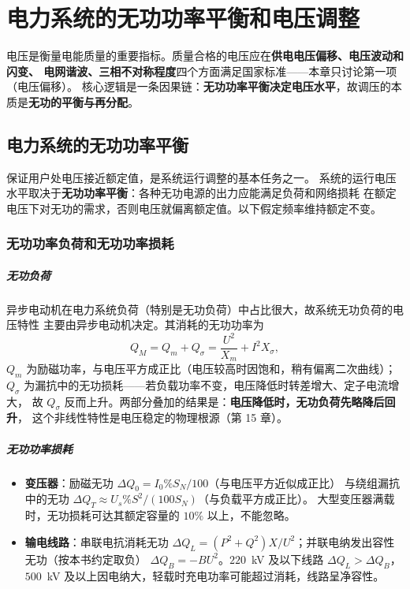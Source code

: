 ﻿%

\chapter{电力系统的无功功率平衡和电压调整}

电压是衡量电能质量的重要指标。质量合格的电压应在\textbf{供电电压偏移、电压波动和闪变、
电网谐波、三相不对称程度}四个方面满足国家标准——本章只讨论第一项（电压偏移）。
核心逻辑是一条因果链：\textbf{无功功率平衡决定电压水平}，故调压的本质是\textbf{无功的平衡与再分配}。

\section{电力系统的无功功率平衡}

保证用户处电压接近额定值，是系统运行调整的基本任务之一。
系统的运行电压水平取决于\textbf{无功功率平衡}：各种无功电源的出力应能满足负荷和网络损耗
在额定电压下对无功的需求，否则电压就偏离额定值。以下假定频率维持额定不变。

\subsection{无功功率负荷和无功功率损耗}

\paragraph{无功负荷}
异步电动机在电力系统负荷（特别是无功负荷）中占比很大，故系统无功负荷的电压特性
主要由异步电动机决定。其消耗的无功功率为
\begin{equation}
  Q_M=Q_m+Q_\sigma=\frac{U^{2}}{X_m}+I^{2}X_\sigma ,
\end{equation}
$Q_m$ 为励磁功率，与电压平方成正比（电压较高时因饱和，稍有偏离二次曲线）；
$Q_\sigma$ 为漏抗中的无功损耗——若负载功率不变，电压降低时转差增大、定子电流增大，
故 $Q_\sigma$ 反而上升。两部分叠加的结果是：\textbf{电压降低时，无功负荷先略降后回升}，
这个非线性特性是电压稳定的物理根源（第 15 章）。

\paragraph{无功功率损耗}
\begin{itemize}
  \item \textbf{变压器}：励磁无功 $\Delta Q_0=I_0\%S_N/100$（与电压平方近似成正比）
        与绕组漏抗中的无功 $\Delta Q_T\approx U_s\%S^{2}/(100S_N)$（与负载平方成正比）。
        大型变压器满载时，无功损耗可达其额定容量的 $10\%$ 以上，不能忽略。
  \item \textbf{输电线路}：串联电抗消耗无功
        $\Delta Q_L=(P^{2}+Q^{2})X/U^{2}$；并联电纳发出容性无功（按本书约定取负）
        $\Delta Q_B=-BU^{2}$。$220$~kV 及以下线路 $\Delta Q_L>\Delta Q_B$，
        $500$~kV 及以上因电纳大，轻载时充电功率可能超过消耗，线路呈净容性。
\end{itemize}

